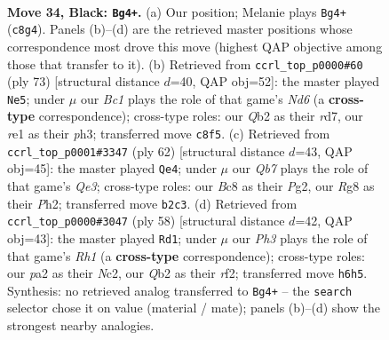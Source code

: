 \documentclass[11pt]{article}
\begin{document}
\clearpage

\begin{figure}[p]\centering
\begin{subfigure}{0.46\textwidth}\centering
\resizebox{\linewidth}{!}{%
\newchessgame
\chessboard[
  setfen={2b2kr1/p4p2/7p/2PBp1p1/8/8/Pq6/3KR3 b - - 2 34},
  showmover=false,
  pgfstyle=straightmove, color=movearrow, markmove={c8-g4}
]}
\caption{}
\end{subfigure}\hfill
\begin{subfigure}{0.46\textwidth}\centering
\resizebox{\linewidth}{!}{%
\newchessgame
\chessboard[
  setfen={5rk1/3R1p2/3p2p1/3B2Pp/8/3nP1PP/6K1/8 b - - 4 37},
  showmover=false,
  pgfstyle=straightmove, color=movearrow, markmove={d3-e5}
]}
\caption{}
\end{subfigure}
\\[4pt]
\begin{subfigure}{0.46\textwidth}\centering
\resizebox{\linewidth}{!}{%
\newchessgame
\chessboard[
  setfen={5k2/4b2p/2r5/r7/P7/1PP1Q3/2K3PP/8 w - - 7 32},
  showmover=false,
  pgfstyle=straightmove, color=movearrow, markmove={e3-e4}
]}
\caption{}
\end{subfigure}\hfill
\begin{subfigure}{0.46\textwidth}\centering
\resizebox{\linewidth}{!}{%
\newchessgame
\chessboard[
  setfen={4n2k/7p/7b/5p2/2B5/4P1P1/2N2r1P/2K4R w - - 4 30},
  showmover=false,
  pgfstyle=straightmove, color=movearrow, markmove={h1-d1}
]}
\caption{}
\end{subfigure}
\caption{\textbf{Move 34, Black: \texttt{Bg4+}.} (a) Our position; Melanie plays \texttt{Bg4+} (\texttt{c8g4}). Panels (b)--(d) are the retrieved master positions whose correspondence most drove this move (highest QAP objective among those that transfer to it). (b) Retrieved from \texttt{ccrl\_top\_p0000\#60} (ply 73) [structural distance $d$=40, QAP obj=52]: the master played \texttt{Ne5}; under $\mu$ our \emph{Bc1} plays the role of that game's \emph{Nd6} (a \textbf{cross-type} correspondence); cross-type roles: our \emph{Q}b2 as their \emph{r}d7, our \emph{r}e1 as their \emph{p}h3; transferred move \texttt{c8f5}. (c) Retrieved from \texttt{ccrl\_top\_p0001\#3347} (ply 62) [structural distance $d$=43, QAP obj=45]: the master played \texttt{Qe4}; under $\mu$ our \emph{Qb7} plays the role of that game's \emph{Qe3}; cross-type roles: our \emph{B}c8 as their \emph{P}g2, our \emph{R}g8 as their \emph{P}h2; transferred move \texttt{b2c3}. (d) Retrieved from \texttt{ccrl\_top\_p0000\#3047} (ply 58) [structural distance $d$=42, QAP obj=43]: the master played \texttt{Rd1}; under $\mu$ our \emph{Ph3} plays the role of that game's \emph{Rh1} (a \textbf{cross-type} correspondence); cross-type roles: our \emph{p}a2 as their \emph{N}c2, our \emph{Q}b2 as their \emph{r}f2; transferred move \texttt{h6h5}. Synthesis: no retrieved analog transferred to \texttt{Bg4+} -- the \texttt{search} selector chose it on value (material / mate); panels (b)--(d) show the strongest nearby analogies.}
\label{fig:thought-m67}
\end{figure}
\end{document}
